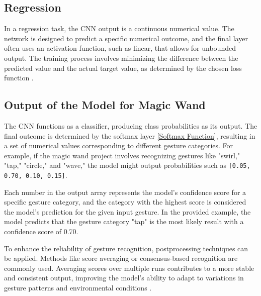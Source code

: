 \begin{figure}[H]\centering
	\label{Fig:5.11}
\end{figure}

\subsection{Regression}

In a regression task, the CNN output is a continuous numerical value. The network is designed to predict a specific numerical outcome, and the final layer often uses an activation function, such as linear, that allows for unbounded output. The training process involves minimizing the difference between the predicted value and the actual target value, as determined by the chosen loss function \cite{Xu:2022}.

\subsection{Output of the Model for Magic Wand}
\label{subsection:outputCNN}

The CNN functions as a classifier, producing class probabilities as its output. The final outcome is determined by the softmax layer \ref{Softmax Function}, resulting in a set of numerical values corresponding to different gesture categories. For example, if the magic wand project involves recognizing gestures like "swirl," "tap," "circle," and "wave," the model might output probabilities such as \texttt{[0.05, 0.70, 0.10, 0.15]}.

Each number in the output array represents the model's confidence score for a specific gesture category, and the category with the highest score is considered the model's prediction for the given input gesture. In the provided example, the model predicts that the gesture category "tap" is the most likely result with a confidence score of 0.70.

To enhance the reliability of gesture recognition, postprocessing techniques can be applied. Methods like score averaging or consensus-based recognition are commonly used. Averaging scores over multiple runs contributes to a more stable and consistent output, improving the model's ability to adapt to variations in gesture patterns and environmental conditions \cite{Warden:2020}.

